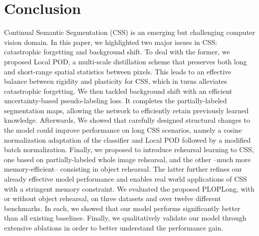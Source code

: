 \section{Conclusion}
\label{sec:seg_conclusion}

Continual Semantic Segmentation (\ac{CSS}) is an emerging but challenging computer vision domain. In this
paper, we highlighted two major issues in \ac{CSS}: catastrophic forgetting and background shift. To deal
with the former, we proposed Local POD, a multi-scale distillation scheme that preserves both long
and short-range spatial statistics between pixels. This leads to an effective balance between
rigidity and plasticity for \ac{CSS}, which in turns alleviates catastrophic forgetting. We then tackled
background shift with an efficient uncertainty-based pseudo-labeling loss. It completes the
partially-labeled segmentation maps, allowing the network to efficiently retain previously learned
knowledge. Afterwards, We showed that carefully designed structural changes to the model could
improve performance on long \ac{CSS} scenarios, namely a cosine normalization adaptation of the
classifier and Local POD followed by a modified batch normalization. Finally, we proposed to
introduce rehearsal learning to \ac{CSS}, one based on partially-labeled whole image rehearsal, and the
other --much more memory-efficient-- consisting in object rehearsal. The latter further refines our
already effective model performance and enables real world applications of \ac{CSS} with a stringent
memory constraint. We evaluated the proposed PLOPLong, with or without object rehearsal, on three
datasets and over twelve different benchmarks. In each, we showed that our model performs
significantly better than all existing baselines. Finally, we qualitatively validate our model
through extensive ablations in order to better understand the performance gain.

